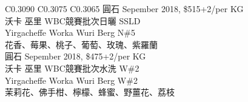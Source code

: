 \documentclass[10pt,a4paper]{article}
\begin{document}
\begin{tabular}{C{0.3090\textwidth} C{0.3075\textwidth} C{0.3065\textwidth}}
{%
圓石 Sepember  2018,  \$515+2/per KG \vspace*{-0.2em} \\ %
 沃卡 巫里 WBC競賽批次日曬 SSLD \vspace*{-0.12em} \\  Yirgacheffe Worka Wuri Berg N\#5%
 \vspace*{-0.22em} \\ %
\footnotesize  花香、莓果、桃子、葡萄、玫瑰、紫羅蘭%
\vspace*{0.345em}\\%
圓石 Sepember  2018,  \$475+2/per KG \vspace*{-0.2em} \\ %
沃卡 巫里 WBC競賽批次水洗 W\#2 \vspace*{-0.12em} \\  Yirgacheffe Worka Wuri Berg W\#2%
 \vspace*{-0.22em} \\ %
\footnotesize 茉莉花、佛手柑、檸檬、蜂蜜、野薑花、荔枝%
}
\end{tabular}
\end{document}
